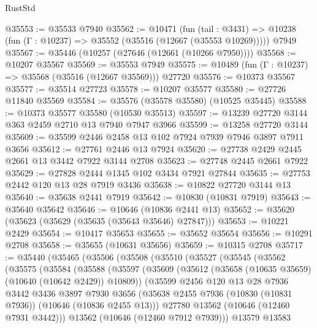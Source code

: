 \begin{lexlean}{RustStd}
\begin{coremodule}
@35553 := @35533 @7940
@35562 := @10471
    (fun (tail : @3431) => @10238 (fun (Γ : @10237) => @35552 (@35516 (@12667 (@35553 @10269)))))
    @7949
@35567 := @35446 (@10257 (@27646 (@12661 (@10266 @7950))))
@35568 := @10207 @35567
@35569 := @35553 @7949
@35575 := @10489 (fun (Γ : @10237) => @35568 (@35516 (@12667 @35569))) @27720
@35576 := @10373 @35567
@35577 := @35514 @27723
@35578 := @10207 @35577
@35580 := @27726 @11840 @35569
@35584 := @35576 (@35578 @35580) (@10525 @35445)
@35588 := @10373 @35577 @35580 (@10530 @35513)
@35597 := @13239 @27720 @3144 @363 @2459 @2710 @13 @7940 @7947 @3966
@35599 := @13258 @27720 @3144
@35609 := @35599 @2446 @2458 @13 @102 @7924 @7939 @7946 @3897 @7911 @3656
@35612 := @27761 @2446 @13 @7924
@35620 := @27738 @2429 @2445 @2661 @13 @3442 @7922 @3144 @2708
@35623 := @27748 @2445 @2661 @7922
@35629 := @27828 @2444 @1345 @102 @3434 @7921 @27844
@35635 := @27753 @2442 @120 @13 @28 @7919 @3436
@35638 := @10822 @27720 @3144 @13
@35640 := @35638 @2441 @7919
@35642 := @10830 (@10831 @7919)
@35643 := @35640 @35642
@35646 := @10646 (@10836 @2441 @13)
@35652 := @35620 (@35623 (@35629 (@35635 (@35643 @35646) @27847)))
@35653 := @10221 @2429
@35654 := @10417 @35653
@35655 := @35652 @35654
@35656 := @10291 @2708
@35658 := @35655 (@10631 @35656)
@35659 := @10315 @2708
@35717 := @35440
    (@35465
      (@35506
        (@35508
          (@35510
            (@35527
              (@35545
                (@35562
                  (@35575
                    (@35584
                      (@35588
                        (@35597
                          (@35609
                            (@35612 (@35658 (@10635 @35659) (@10640 (@10642 @2429)) @10809))
                            (@35599
                              @2456
                              @120
                              @13
                              @28
                              @7936
                              @3442
                              @3436
                              @3897
                              @7930
                              @3656
                              (@35638
                                @2455
                                @7936
                                (@10830 (@10831 @7936))
                                (@10646 (@10836 @2455 @13)))
                              @27780
                              @13562
                              (@10646 (@12460 @7931 @3442)))
                            @13562
                            (@10646 (@12460 @7912 @7939)))
                          @13579
                          @13583

\end{coremodule}
\end{lexlean}
